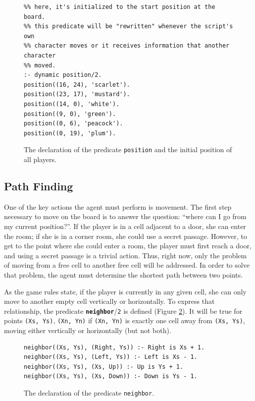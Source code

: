 \documentclass[12pt,a4paper]{article}
\newcommand{\varname}[1]{\texttt{#1}}
\newcommand{\varnamebf}[1]{\textbf{\texttt{#1}}}
\newcommand{\predprot}[2]{{\color{MidnightBlue}\varnamebf{#1}}/{\color{Mulberry}\varname{#2}}}
\newcommand{\predname}[1]{{\color{MidnightBlue}\varname{#1}}}
\begin{document}
\begin{figure}[hb]
	\centering
\begin{lstlisting}[style=Prolog-pygsty]
%% position((X, Y), C) - the current position of character C is <X, Y>
%% here, it's initialized to the start position at the board.
%% this predicate will be "rewritten" whenever the script's own
%% character moves or it receives information that another character
%% moved.
:- dynamic position/2.
position((16, 24), 'scarlet').
position((23, 17), 'mustard').
position((14, 0), 'white').
position((9, 0), 'green').
position((0, 6), 'peacock').
position((0, 19), 'plum').
\end{lstlisting}
	\caption{The declaration of the predicate \predname{position} and the initial position of all players.} 
	\label{fig:start-positions}
\end{figure}

\subsection{Path Finding}

One of the key actions the agent must perform is movement. The first step necessary to move on the board is to answer the question: ``where can I go from my current position?''. If the player is in a cell adjacent to a door, she can enter the room; if she is in a corner room, she could use a secret passage. However, to get to the point where she could enter a room, the player must first reach a door, and using a secret passage is a trivial action. Thus, right now, only the problem of moving from a free cell to another free cell will be addressed. In order to solve that problem, the agent must determine the shortest path between two points.

As the game rules state, if the player is currently in any given cell, she can only move to another empty cell vertically or horizontally. To express that relationship, the predicate \predprot{neighbor}{2} is defined (Figure \ref{fig:neighbor}). It will be true for points \varname{(Xs, Ys)}, \varname{(Xn, Yn)} if \varname{(Xn, Yn)} is exactly one cell away from \varname{(Xs, Ys)}, moving either vertically or horizontally (but not both).

\begin{figure}[H]
	\centering
\begin{lstlisting}[style=Prolog-pygsty]
%% neighbor((Xs, Ys), (Xn, Yn)) - <Xn, Yn> is neighbor of <Xs, Ys>.
neighbor((Xs, Ys), (Right, Ys)) :- Right is Xs + 1.
neighbor((Xs, Ys), (Left, Ys)) :- Left is Xs - 1.
neighbor((Xs, Ys), (Xs, Up)) :- Up is Ys + 1.
neighbor((Xs, Ys), (Xs, Down)) :- Down is Ys - 1.
\end{lstlisting}
	\caption{The declaration of the predicate \predname{neighbor}.} 
	\label{fig:neighbor}
\end{figure}
\end{document}
